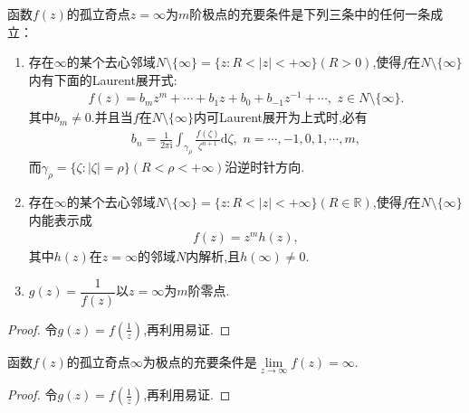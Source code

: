 \documentclass[../../main.tex]{subfiles}%
\begin{document}
\begin{theorem}\label{theorem:无穷远点为m阶极点的充要条件}
函数$f(z)$的孤立奇点$z=\infty$为$m$阶极点的充要条件是下列三条中的任何一条成立：
\begin{enumerate}[(1)]
\item\label{theorem:无穷远点为m阶极点的充要条件-1} 存在$\infty$的某个去心邻域$N\setminus \{\infty\}=\{z:R<|z|<+\infty\}(R>0)$,使得\( f \)在$N\setminus \{\infty\}$内有下面的Laurent展开式:
\begin{align*}
f(z) = b_m z^m + \cdots + b_1 z + b_0 + b_{-1} z^{-1} + \cdots,\,\,z\in N\setminus \{\infty\}.
\end{align*}
其中$b_m\neq 0$.并且当\( f \)在$N\setminus \{\infty\}$内可Laurent展开为上式时,必有
\begin{align*}
b_n=\frac{1}{2\pi \mathrm{i}}\int_{\gamma _{\rho}}{\frac{f\left( \zeta \right)}{\zeta^{n+1}}\mathrm{d}\zeta},\,\,n=\cdots,-1,0,1,\cdots,m ,
\end{align*}
而\( \gamma_{\rho} = \{ \zeta: |\zeta| = \rho \} \)\( (R < \rho <+\infty )\)沿逆时针方向.

\item\label{theorem:无穷远点为m阶极点的充要条件-2} 存在$\infty$的某个去心邻域$N\setminus \{\infty\}=\{z:R<|z|<+\infty\}(R\in \mathbb{R})$,使得\( f \)在$N\setminus \{\infty\}$内能表示成
\begin{align*}
f(z)=z^m h(z),
\end{align*}
其中$h(z)$在$z=\infty$的邻域$N$内解析,且$h(\infty)\neq0$.

\item\label{theorem:无穷远点为m阶极点的充要条件-3} $g(z)=\dfrac{1}{f(z)}$以$z=\infty$为$m$阶零点.
\end{enumerate}
\end{theorem}
\begin{proof}
令$g(z)=f\left( \frac{1}{z} \right) $,再利用易证.
\end{proof}

\begin{theorem}
函数$f(z)$的孤立奇点$\infty$为极点的充要条件是$\lim\limits_{z \to \infty}f(z)=\infty$.
\end{theorem}
\begin{proof}
令$g(z)=f\left( \frac{1}{z} \right) $,再利用易证.
\end{proof}
\end{document}

